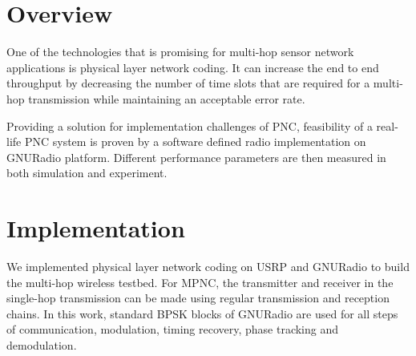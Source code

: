 \label{chapter:multi}

\section{Overview}

One of the technologies that is promising for multi-hop sensor network applications is physical layer network coding. It can increase the end to end throughput by decreasing the number of time slots that are required for a multi-hop transmission while maintaining an acceptable error rate. %


Providing a solution for implementation challenges of PNC, feasibility of a real-life PNC system is proven by a software defined radio implementation on GNURadio platform. Different performance parameters are then measured in both simulation and experiment. 

\section{Implementation}
We implemented physical layer network coding on USRP and GNURadio to build the multi-hop wireless testbed.
For MPNC, the transmitter and receiver in the single-hop transmission can be made using regular transmission and reception chains. In this work, standard BPSK blocks of GNURadio are used for all steps of communication, modulation, timing recovery, phase tracking and demodulation.

